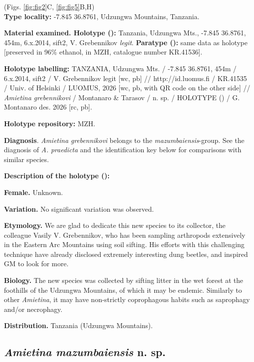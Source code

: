 \documentclass[fleqn,10pt,lineno]{wlpeerj}
\begin{document}
(Figs. \ref{fig:fig2}C, \ref{fig:fig5}B,H)\\

\textbf{Type locality:} -7.845 36.8761, Udzungwa Mountains, Tanzania.

\textbf{Material examined. Holotype (\male):} Tanzania, Udzungwa Mts., -7.845 36.8761, 454m, 6.x.2014, sift2, V. Grebennikov \textit{legit}. \textbf{Paratype (\male):} same data as holotype [preserved in 96\% ethanol, in MZH, catalogue number KR.41536].

\textbf{Holotype labelling:} TANZANIA, Udzungwa Mts. / -7.845 36.8761, 454m / 6.x.2014, sift2 / V. Grebennikov legit [wc, pb] // http://id.luomus.fi / KR.41535 / Univ. of Helsinki / LUOMUS, 2026 [wc, pb, with QR code on the other side] // \textit{Amietina grebennikovi} / Montanaro \& Tarasov / n. sp. / HOLOTYPE (\male) / G. Montanaro des. 2026 [rc, pb].

\textbf{Holotype repository:} MZH.

\textbf{Diagnosis}. \textit{Amietina grebennikovi} belongs to the \textit{mazumbaiensis}-group. See the diagnosis of \textit{A. praedicta} and the identification key below for comparisons with similar species.


\textbf{Description of the holotype (\male):}


\textbf{Female.} Unknown.

\textbf{Variation.} No significant variation was observed.

\textbf{Etymology.} We are glad to dedicate this new species to its collector, the colleague Vasily V. Grebennikov, who has been sampling arthropods extensively in the Eastern Arc Mountains using soil sifting. His efforts with this challenging technique have already disclosed extremely interesting dung beetles, and inspired GM to look for more.

\textbf{Biology.} The new species was collected by sifting litter in the wet forest at the foothills of the Udzungwa Mountains, of which it may be endemic. Similarly to other \textit{Amietina}, it may have non-strictly coprophagous habits such as saprophagy and/or necrophagy.

\textbf{Distribution.} Tanzania (Udzungwa Mountains).




\subsection*{\textbf{\textit{Amietina mazumbaiensis} n. sp.}}
\end{document}
